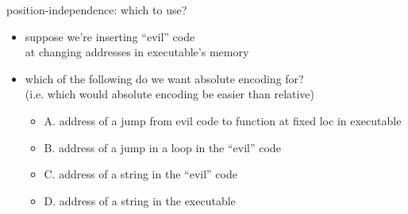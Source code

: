 \begin{frame}{position-independence: which to use?}
\begin{itemize}
\item suppose we're inserting ``evil'' code \\
at changing addresses in executable's memory
\item which of the following do we want absolute encoding for? \\
(i.e. which would absolute encoding be easier than relative)
    \begin{itemize}
    \item A. address of a jump from evil code to function at fixed loc in executable
    \item B. address of a jump in a loop in the ``evil'' code
    \item C. address of a string in the ``evil'' code
    \item D. address of a string in the executable
    \end{itemize}
\end{itemize}
\end{frame}
